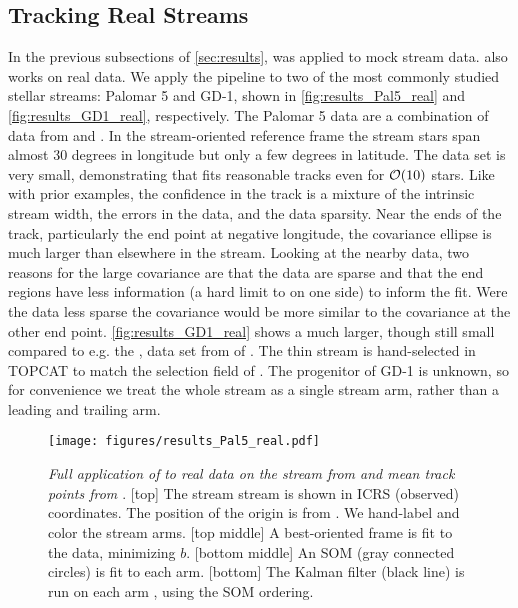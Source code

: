 \documentclass[fleqn,usenatbib]{mnras}
\begin{document}

  \subsection{Tracking Real Streams}
  \label{sub:tracking_real_streams}

    In the previous subsections of \autoref{sec:results}, \trackstream{} was
    applied to mock stream data. \trackstream{} also works on real data. We
    apply the pipeline to two of the most commonly studied stellar streams:
    Palomar 5 and GD-1, shown in \autoref{fig:results_Pal5_real} and
    \autoref{fig:results_GD1_real}, respectively. The Palomar 5 data are a
    combination of data from \citet{Ibata2017} and \citet{Starkman2019}. In the
    stream-oriented reference frame the stream stars span almost 30 degrees in
    longitude but only a few degrees in latitude. The data set is very small,
    demonstrating that \trackstream{} fits reasonable tracks even for
    $\mathcal{O}(10)$ stars. Like with prior examples, the confidence in the track
    is a mixture of the intrinsic stream width, the errors in the data, and the
    data sparsity. Near the ends of the track, particularly the end point at
    negative longitude, the covariance ellipse is much larger than elsewhere in
    the stream. Looking at the nearby data, two reasons for the large covariance
    are that the data are sparse and that the end regions have less information
    (a hard limit to on one side) to inform the fit. Were the data less sparse
    the covariance would be more similar to the covariance at the other end
    point. \autoref{fig:results_GD1_real} shows a much larger, though still
    small compared to e.g. the \nbody, data set from \citet{Price-Whelan2018} of
    . The thin stream is hand-selected in TOPCAT \citep{Taylor2005}
    to match the selection field of \citet[][figure 2]{Price-Whelan2018}. The
    progenitor of GD-1 is unknown, so for convenience we treat the whole stream
    as a single stream arm, rather than a leading and trailing arm.

    \begin{figure}
      \centering
      \texttt{[image: figures/results\_Pal5\_real.pdf]}
      \caption{\label{fig:results_Pal5_real}
        \emph{Full application of} \trackstream{} \emph{to real data on the
         stream from \citet{Ibata2017} and mean track points
        from \citet{Starkman2019}}.
        [top] The stream stream is shown in ICRS (observed) coordinates. The
        position of the origin is from \citet{Vasiliev2019}. We hand-label and
        color the stream arms.
        [top middle] A best-oriented frame is fit to the data, minimizing $b$.
        [bottom middle] An SOM (gray connected circles) is fit to each arm. 
        [bottom] The Kalman filter (black line) is run on each arm , using the
        SOM ordering. }
    \end{figure}
\end{document}
